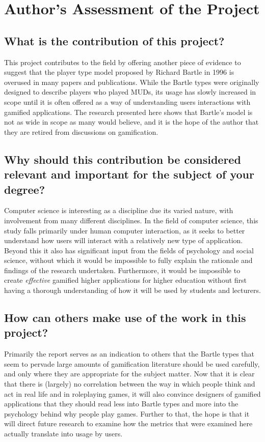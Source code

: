 \documentclass[12pt,a4paper,twoside]{report}
\begin{document}
\chapter{Author's Assessment of the Project}
\label{sec:issues}
\section{What is the contribution of this project?}
This project contributes to the field by offering another piece of evidence to suggest that the player type model proposed by Richard Bartle in 1996 is overused in many papers and publications. While the Bartle types were originally designed to describe players who played MUDs, its usage has slowly increased in scope until it is often offered as a way of understanding users interactions with gamified applications. The research presented here shows that Bartle's model is not as wide in scope as many would believe, and it is the hope of the author that they are retired from discussions on gamification.
\section{Why should this contribution be considered relevant and important for the subject of your degree?}
Computer science is interesting as a discipline due its varied nature, with involvement from many different disciplines. In the field of computer science, this study falls primarily under human computer interaction, as it seeks to better understand how users will interact with a relatively new type of application. Beyond this it also has significant input from the fields of psychology and social science, without which it would be impossible to fully explain the rationale and findings of the research undertaken. Furthermore, it would be impossible to create \textit{effective} gamified higher applications for higher education without first having a thorough understanding of how it will be used by students and lecturers.
\section{How can others make use of the work in this project?}
Primarily the report serves as an indication to others that the Bartle types that seem to pervade large amounts of gamification literature should be used carefully, and only where they are appropriate for the subject matter. Now that it is clear that there is (largely) no correlation between the way in which people think and act in real life and in roleplaying games, it will also convince designers of gamified applications that they should read less into Bartle types and more into the psychology behind why people play games. Further to that, the hope is that it will direct future research to examine how the metrics that were examined here actually translate into usage by users.
\end{document}
